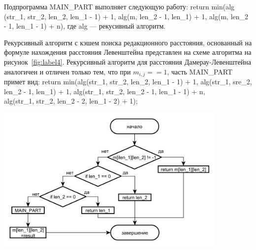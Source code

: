 \documentclass[14pt]{article}
\begin{document}
Подпрограмма MAIN\_PART выполняет следующую работу: return min(alg (str\_1, str\_2, len\_2, len\_1 - 1) + 1, alg(m, len\_2 - 1, len\_1) + 1, alg(m, len\_2 - 1, len\_1 - 1) + n), где alg --- рекусивный алгоритм.

\newpage
Рекурсивный алгоритм с кэшем поиска редакционного расстояния, основанный на формуле нахождения расстояния Левенштейна представлен на схеме алгоритма на рисунок~\ref{fig:label4}.
Рекурсивный алгоритм для расстояния Дамерау-Левенштейна аналогичен и отличен только тем, что при $m_{i,j} == 1$, часть MAIN\_PART примет вид:
return min(alg(str\_1, str\_2, len\_2, len\_1 - 1) + 1, alg(str\_1, sre\_2, len\_2 - 1, len\_1) + 1,
alg(str\_1, str\_2, len\_2 - 1, len\_1 - 1) + n, \\
alg(str\_1, str\_2, len\_2 - 2, len\_1 - 2) + 1);  

\begin{center}
\includegraphics[width = 0.85\textwidth]{flowchart_4}
\label{fig:label4}
\end{center}

\newpage
\end{document}
